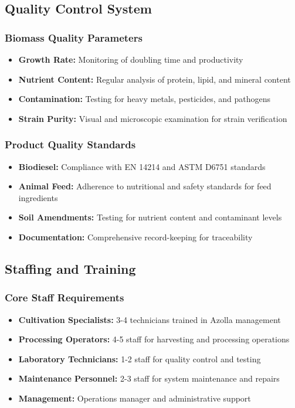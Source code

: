 \subsection{Quality Control System}

\subsubsection{Biomass Quality Parameters}
\begin{itemize}
    \item \textbf{Growth Rate:} Monitoring of doubling time and productivity
    \item \textbf{Nutrient Content:} Regular analysis of protein, lipid, and mineral content
    \item \textbf{Contamination:} Testing for heavy metals, pesticides, and pathogens
    \item \textbf{Strain Purity:} Visual and microscopic examination for strain verification
\end{itemize}

\subsubsection{Product Quality Standards}
\begin{itemize}
    \item \textbf{Biodiesel:} Compliance with EN 14214 and ASTM D6751 standards
    \item \textbf{Animal Feed:} Adherence to nutritional and safety standards for feed ingredients
    \item \textbf{Soil Amendments:} Testing for nutrient content and contaminant levels
    \item \textbf{Documentation:} Comprehensive record-keeping for traceability
\end{itemize}

\subsection{Staffing and Training}

\subsubsection{Core Staff Requirements}
\begin{itemize}
    \item \textbf{Cultivation Specialists:} 3-4 technicians trained in Azolla management
    \item \textbf{Processing Operators:} 4-5 staff for harvesting and processing operations
    \item \textbf{Laboratory Technicians:} 1-2 staff for quality control and testing
    \item \textbf{Maintenance Personnel:} 2-3 staff for system maintenance and repairs
    \item \textbf{Management:} Operations manager and administrative support
\end{itemize}

